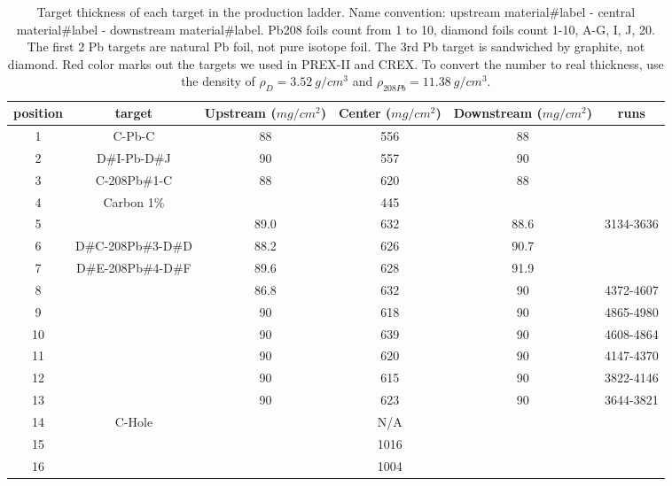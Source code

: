 \begin{table}[!htbp]
    \centering
    \begin{tabular}{c | c | c c c c}
	\hline
	position    & target& \makecell{Upstream \\ ($mg/cm^2$)}    & \makecell{Center \\ ($mg/cm^2$)}     & \makecell{Downstream \\ ($mg/cm^2$)}   & runs  \\
	\hline
	1   & C-Pb-C	    & 88    & 556   & 88    & \\
	2   & D\#I-Pb-D\#J      & 90    & 557   & 90    & \\
	\hline
	3   & C-208Pb\#1-C    & 88    & 620   & 88    & \\
	4   & Carbon 1\%    &       & 445   &	    & \\
	\hline
	5   & \color{red}{D\#A-208Pb\#2-D\#B}  & 89.0  & 632   & 88.6  & 3134-3636 \\
	6   & D\#C-208Pb\#3-D\#D  & 88.2  & 626   & 90.7  & \\
	7   & D\#E-208Pb\#4-D\#F  & 89.6  & 628   & 91.9  & \\
	8   & \color{red}{D\#G-208Pb\#5-D\#20} & 86.8  & 632   & 90    & 4372-4607 \\
	9   & \color{red}{D\#1-208Pb\#6-D\#2}  & 90    & 618   & 90    & 4865-4980 \\
	10  & \color{red}{D\#3-208Pb\#7-D\#4}  & 90    & 639   & 90    & 4608-4864 \\
	11  & \color{red}{D\#5-208Pb\#8-D\#6}  & 90    & 620   & 90    & 4147-4370 \\
	12  & \color{red}{D\#7-208Pb\#9-D\#8}  & 90    & 615   & 90    & 3822-4146 \\
	13  & \color{red}{D\#9-208Pb\#10-D\#10}& 90    & 623   & 90    & 3644-3821 \\
	\hline
	14  & C-Hole	    &       & N/A   &       & \\
	15  & \color{red}{\Ca}	    &       & 1016  &       & \\
	16  & \ca	    &       & 1004  &       & \\
	\hline
    \end{tabular}
    \caption{Target thickness of each target in the production ladder. 
    Name convention: upstream material\#label - central material\#label - downstream material\#label. 
    Pb208 foils count from 1 to 10, diamond foils count 1-10, A-G, I, J, 20. 
    The first 2 Pb targets are natural Pb foil, not pure \Pb isotope foil. 
    The 3rd Pb target is sandwiched by graphite, not diamond. Red color marks
    out the targets we used in PREX-II and CREX. To convert the number to real 
    thickness, use the density of $\rho_D = 3.52\ g/cm^3$ and $\rho_{208Pb} 
    = 11.38 \ g/cm^3$.}
    \label{tab:target_thickness}
\end{table}

